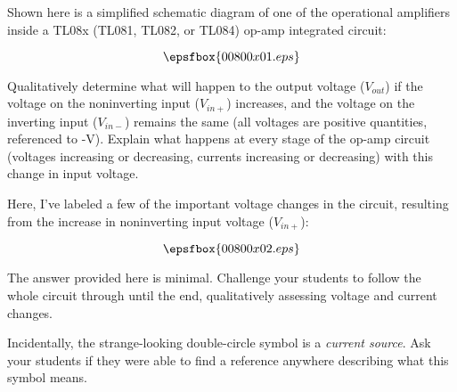 

Shown here is a simplified schematic diagram of one of the operational amplifiers inside a TL08x (TL081, TL082, or TL084) op-amp integrated circuit:

$$\epsfbox{00800x01.eps}$$

Qualitatively determine what will happen to the output voltage ($V_{out}$) if the voltage on the noninverting input ($V_{in+}$) increases, and the voltage on the inverting input ($V_{in-}$) remains the same (all voltages are positive quantities, referenced to -V).  Explain what happens at every stage of the op-amp circuit (voltages increasing or decreasing, currents increasing or decreasing) with this change in input voltage.







Here, I've labeled a few of the important voltage changes in the circuit, resulting from the increase in noninverting input voltage ($V_{in+}$):

$$\epsfbox{00800x02.eps}$$







The answer provided here is minimal.  Challenge your students to follow the whole circuit through until the end, qualitatively assessing voltage and current changes.

Incidentally, the strange-looking double-circle symbol is a {\it current source}.  Ask your students if they were able to find a reference anywhere describing what this symbol means.




